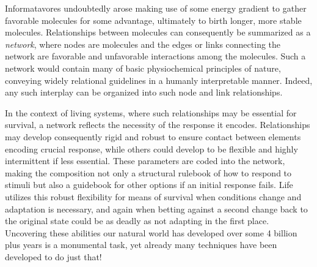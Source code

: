 Informatavores undoubtedly arose making use of some energy gradient to gather favorable molecules for some advantage, ultimately to birth longer, more stable molecules. Relationships between molecules can consequently be summarized as a \emph{network}, where nodes are molecules and the edges or links connecting the network are favorable and unfavorable interactions among the molecules. Such a network would contain many of basic physiochemical principles of nature, conveying widely relational guidelines in a humanly interpretable manner. Indeed, any such interplay can be organized into such node and link relationships.

In the context of living systems, where such relationships may be essential for survival, a network reflects the necessity of the response it encodes. Relationships may develop consequently rigid and robust to ensure contact between elements encoding crucial response, while others could develop to be flexible and highly intermittent if less essential.
These parameters are coded into the network, making the composition not only a structural rulebook of how to respond to stimuli but also a guidebook for other options if an initial response fails. 
Life utilizes this robust flexibility for means of survival when conditions change and adaptation is necessary, and again when betting against a second change back to the original state could be as deadly as not adapting in the first place. Uncovering these abilities our natural world has developed over some 4 billion plus years is a monumental task, yet already many techniques have been developed to do just that!

